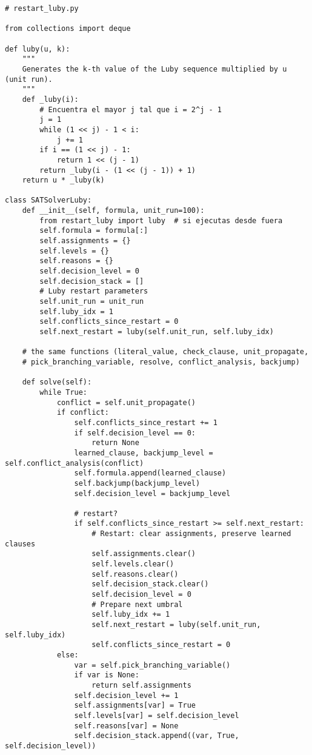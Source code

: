 \begin{lstlisting}
# restart_luby.py

from collections import deque

def luby(u, k):
    """
    Generates the k-th value of the Luby sequence multiplied by u (unit run).
    """
    def _luby(i):
        # Encuentra el mayor j tal que i = 2^j - 1
        j = 1
        while (1 << j) - 1 < i:
            j += 1
        if i == (1 << j) - 1:
            return 1 << (j - 1)
        return _luby(i - (1 << (j - 1)) + 1)
    return u * _luby(k)

class SATSolverLuby:
    def __init__(self, formula, unit_run=100):
        from restart_luby import luby  # si ejecutas desde fuera
        self.formula = formula[:]  
        self.assignments = {}
        self.levels = {}
        self.reasons = {}
        self.decision_level = 0
        self.decision_stack = []
        # Luby restart parameters
        self.unit_run = unit_run
        self.luby_idx = 1
        self.conflicts_since_restart = 0
        self.next_restart = luby(self.unit_run, self.luby_idx)

    # the same functions (literal_value, check_clause, unit_propagate,
    # pick_branching_variable, resolve, conflict_analysis, backjump)

    def solve(self):
        while True:
            conflict = self.unit_propagate()
            if conflict:
                self.conflicts_since_restart += 1
                if self.decision_level == 0:
                    return None
                learned_clause, backjump_level = self.conflict_analysis(conflict)
                self.formula.append(learned_clause)
                self.backjump(backjump_level)
                self.decision_level = backjump_level

                # restart?
                if self.conflicts_since_restart >= self.next_restart:
                    # Restart: clear assignments, preserve learned clauses
                    self.assignments.clear()
                    self.levels.clear()
                    self.reasons.clear()
                    self.decision_stack.clear()
                    self.decision_level = 0
                    # Prepare next umbral
                    self.luby_idx += 1
                    self.next_restart = luby(self.unit_run, self.luby_idx)
                    self.conflicts_since_restart = 0
            else:
                var = self.pick_branching_variable()
                if var is None:
                    return self.assignments
                self.decision_level += 1
                self.assignments[var] = True
                self.levels[var] = self.decision_level
                self.reasons[var] = None
                self.decision_stack.append((var, True, self.decision_level))
\end{lstlisting}



